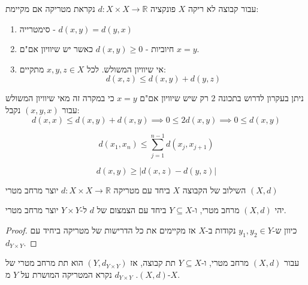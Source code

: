\documentclass{tstextbook}
\begin{document}
\begin{definition}[מטריקה]
עבור קבוצה לא ריקה \(X\) פונקציה \(d:X\times X\to \mathbb{R}\) נקראת מטריקה אם מקיימת:

  \begin{enumerate}
    \item סימטרייה - \(d(x,y)=d(y,x)\)


    \item חיוביות - \(d(x,y)\geq 0\) כאשר יש שיוויון אם"ם \(x=y\). 


    \item אי שיוויון המשולש. לכל \(x,y,z\in X\) מתקיים: 
$$d(x,z)\leq d(x,y)+d(y,z)$$


  \end{enumerate}
\end{definition}
\begin{remark}
ניתן בעקרון לדרוש בתכונה \(2\) רק שיש שיוויון אם"ם \(x=y\) כי במקרה זה מאי שיוויון המשולש עבור \((x,y,x)\) נקבל:
$$d(x,x)\leq d(x,y)+d(x,y)\implies 0\leq 2d(x,y)\implies 0\leq d(x,y)$$

\end{remark}
\begin{proposition}
$$d(x_{1},x_{n})\leq\sum_{j=1}^{n-1}d(x_{j},x_{j+1})$$

\end{proposition}
\begin{proposition}
$$d(x,y)\geq|d(x,z)-d(y,z)|$$

\end{proposition}
\begin{definition}
השילוב של הקבוצה \(X\) ביחד עם מטריקה \(d:X\times X\to \mathbb{R}\) יוצר מרחב מטרי \((X,d)\)

\end{definition}
\begin{proposition}
יהי \((X,d)\) מרחב מטרי, ו-\(Y\subseteq X\) ביחד עם הצמצום של \(d\) ל-\(Y\times Y\) יוצר מרחב מטרי. 

\end{proposition}
\begin{proof}
כיוון ש-\(y_{1},y_{2}\in Y\) נקודות ב-\(X\) אז מקיימים את כל הדרישות של מטריקה ביחיד עם \(d_{Y\times Y}\).

\end{proof}
\begin{definition}
עבור \((X,d)\) מרחב מטרי, ו-\(Y\subseteq X\) תת קבוצה, אז \(\left( Y,d_{Y\times Y}\right)\) הוא תת מרחב מטרי של \((X,d)\). \(d_{Y\times Y}\) נקרא המטריקה המושרת על \(Y\) מ-\(X\).

\end{definition}
\end{document}

